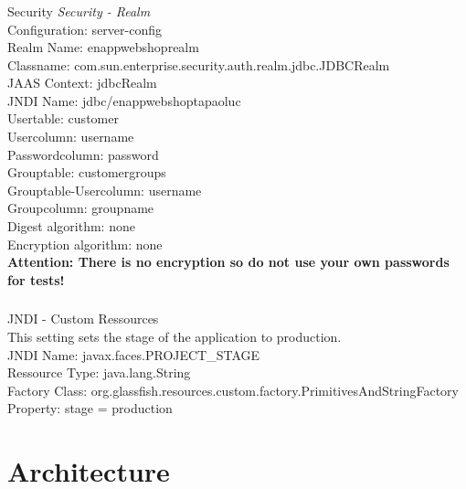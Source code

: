 \documentclass[11pt]{amsart}
\begin{document}
\subsubsection{}Security
%
\textit{Security - Realm} \\
Configuration: server-config \\
Realm Name: enappwebshoprealm \\
Classname: com.sun.enterprise.security.auth.realm.jdbc.JDBCRealm \\
JAAS Context: jdbcRealm \\
JNDI Name: jdbc/enappwebshoptapaoluc \\
Usertable: customer \\
Usercolumn: username \\
Passwordcolumn: password \\
Grouptable: customergroups \\
Grouptable-Usercolumn: username \\
Groupcolumn: groupname \\
Digest algorithm: none \\
Encryption algorithm: none \\
%
\textbf{Attention: There is no encryption so do not use your own passwords for tests!}
%
\subsubsection{}JNDI - Custom Ressources \\
This setting sets the stage of the application to production. \\
JNDI Name: javax.faces.PROJECT\_STAGE \\
Ressource Type: java.lang.String \\
Factory Class: org.glassfish.resources.custom.factory.PrimitivesAndStringFactory \\
Property: stage = production \\
%
\newpage{}
\section{Architecture}
\end{document}

